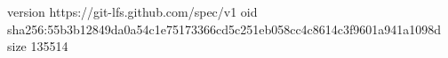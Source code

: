 version https://git-lfs.github.com/spec/v1
oid sha256:55b3b12849da0a54c1e75173366cd5c251eb058cc4c8614c3f9601a941a1098d
size 135514
